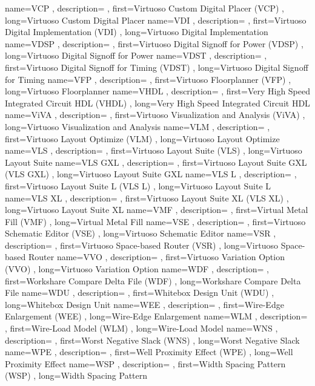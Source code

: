 { name={VCP}
, description={}
, first={Virtuoso Custom Digital Placer (VCP)}
, long={Virtuoso Custom Digital Placer}
}
{ name={VDI}
, description={}
, first={Virtuoso Digital Implementation (VDI)}
, long={Virtuoso Digital Implementation}
}
{ name={VDSP}
, description={}
, first={Virtuoso Digital Signoff for Power (VDSP)}
, long={Virtuoso Digital Signoff for Power}
}
{ name={VDST}
, description={}
, first={Virtuoso Digital Signoff for Timing (VDST)}
, long={Virtuoso Digital Signoff for Timing}
}
{ name={VFP}
, description={}
, first={Virtuoso Floorplanner (VFP)}
, long={Virtuoso Floorplanner}
}
{ name={VHDL}
, description={}
, first={Very High Speed Integrated Circuit HDL (VHDL)}
, long={Very High Speed Integrated Circuit HDL}
}
{ name={ViVA}
, description={}
, first={Virtuoso Visualization and Analysis (ViVA)}
, long={Virtuoso Visualization and Analysis}
}
{ name={VLM}
, description={}
, first={Virtuoso Layout Optimize (VLM)}
, long={Virtuoso Layout Optimize}
}
{ name={VLS}
, description={}
, first={Virtuoso Layout Suite (VLS)}
, long={Virtuoso Layout Suite}
}
{ name={VLS GXL}
, description={}
, first={Virtuoso Layout Suite GXL (VLS GXL)}
, long={Virtuoso Layout Suite GXL}
}
{ name={VLS L}
, description={}
, first={Virtuoso Layout Suite L (VLS L)}
, long={Virtuoso Layout Suite L}
}
{ name={VLS XL}
, description={}
, first={Virtuoso Layout Suite XL (VLS XL)}
, long={Virtuoso Layout Suite XL}
}
{ name={VMF}
, description={}
, first={Virtual Metal Fill (VMF)}
, long={Virtual Metal Fill}
}
{ name={VSE}
, description={}
, first={Virtuoso Schematic Editor (VSE)}
, long={Virtuoso Schematic Editor}
}
{ name={VSR}
, description={}
, first={Virtuoso Space-based Router (VSR)}
, long={Virtuoso Space-based Router}
}
{ name={VVO}
, description={}
, first={Virtuoso Variation Option (VVO)}
, long={Virtuoso Variation Option}
}
{ name={WDF}
, description={}
, first={Workshare Compare Delta File (WDF)}
, long={Workshare Compare Delta File}
}
{ name={WDU}
, description={}
, first={Whitebox Design Unit (WDU)}
, long={Whitebox Design Unit}
}
{ name={WEE}
, description={}
, first={Wire-Edge Enlargement (WEE)}
, long={Wire-Edge Enlargement}
}
{ name={WLM}
, description={}
, first={Wire-Load Model (WLM)}
, long={Wire-Load Model}
}
{ name={WNS}
, description={}
, first={Worst Negative Slack (WNS)}
, long={Worst Negative Slack}
}
{ name={WPE}
, description={}
, first={Well Proximity Effect (WPE)}
, long={Well Proximity Effect}
}
{ name={WSP}
, description={}
, first={Width Spacing Pattern (WSP)}
, long={Width Spacing Pattern}
}
